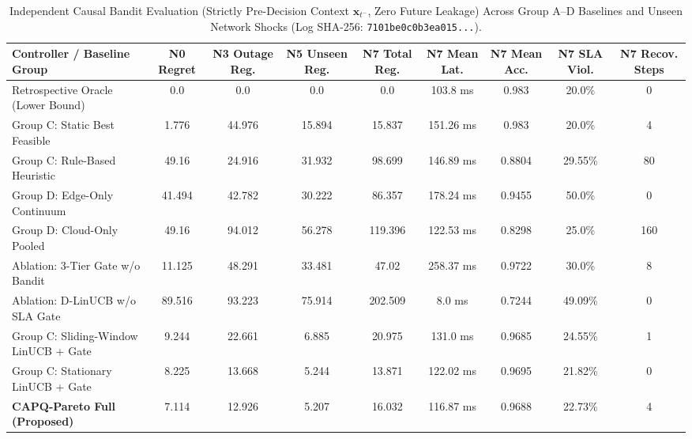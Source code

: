 \begin{table}[!t]
\centering
\caption{Independent Causal Bandit Evaluation (Strictly Pre-Decision Context $\mathbf{x}_{t^-}$, Zero Future Leakage) Across Group A--D Baselines and Unseen Network Shocks (Log SHA-256: \texttt{7101be0c0b3ea015...}).}
\label{tab:shock_bandit}
\scriptsize
\setlength{\tabcolsep}{3.8pt}
\begin{tabular}{lcccccccc}
\toprule
\textbf{Controller / Baseline Group} & \textbf{N0 Regret} & \textbf{N3 Outage Reg.} & \textbf{N5 Unseen Reg.} & \textbf{N7 Total Reg.} & \textbf{N7 Mean Lat.} & \textbf{N7 Mean Acc.} & \textbf{N7 SLA Viol.} & \textbf{N7 Recov. Steps} \\
\midrule
Retrospective Oracle (Lower Bound) & 0.0 & 0.0 & 0.0 & 0.0 & 103.8 ms & 0.983 & 20.0\% & 0 \\
Group C: Static Best Feasible & 1.776 & 44.976 & 15.894 & 15.837 & 151.26 ms & 0.983 & 20.0\% & 4 \\
Group C: Rule-Based Heuristic & 49.16 & 24.916 & 31.932 & 98.699 & 146.89 ms & 0.8804 & 29.55\% & 80 \\
Group D: Edge-Only Continuum & 41.494 & 42.782 & 30.222 & 86.357 & 178.24 ms & 0.9455 & 50.0\% & 0 \\
Group D: Cloud-Only Pooled & 49.16 & 94.012 & 56.278 & 119.396 & 122.53 ms & 0.8298 & 25.0\% & 160 \\
Ablation: 3-Tier Gate w/o Bandit & 11.125 & 48.291 & 33.481 & 47.02 & 258.37 ms & 0.9722 & 30.0\% & 8 \\
Ablation: D-LinUCB w/o SLA Gate & 89.516 & 93.223 & 75.914 & 202.509 & 8.0 ms & 0.7244 & 49.09\% & 0 \\
Group C: Sliding-Window LinUCB + Gate & 9.244 & 22.661 & 6.885 & 20.975 & 131.0 ms & 0.9685 & 24.55\% & 1 \\
Group C: Stationary LinUCB + Gate & 8.225 & 13.668 & 5.244 & 13.871 & 122.02 ms & 0.9695 & 21.82\% & 0 \\
\textbf{CAPQ-Pareto Full (Proposed)} & 7.114 & 12.926 & 5.207 & 16.032 & 116.87 ms & 0.9688 & 22.73\% & 4 \\
\bottomrule
\end{tabular}
\end{table}